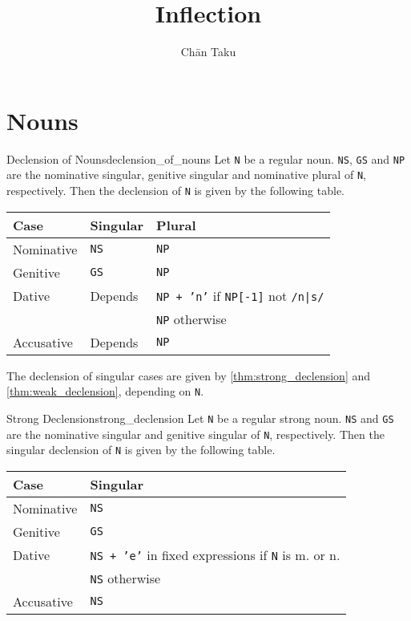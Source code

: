 \documentclass{article}
\title{Inflection}
\author{Ch\=an Taku}
\begin{document}
\maketitle

\section{Nouns}

\begin{theorem}{Declension of Nouns}{declension_of_nouns}
    Let \texttt{N} be a regular noun.
    \texttt{NS}, \texttt{GS} and \texttt{NP} are the nominative singular, genitive singular and nominative plural of \texttt{N}, respectively.
    Then the declension of \texttt{N} is given by the following table.
    \begin{longtable}{lll}
        \toprule
        Case & Singular & Plural \\
        \midrule
        Nominative & \texttt{NS} & \texttt{NP} \\
        Genitive & \texttt{GS} & \texttt{NP} \\
        Dative & Depends & \texttt{NP + 'n'} if \texttt{NP[-1]} not \texttt{/n|s/} \\
        & & \texttt{NP} otherwise \\
        Accusative & Depends & \texttt{NP} \\
        \bottomrule
    \end{longtable}
    The declension of singular cases are given by \cref{thm:strong_declension} and \cref{thm:weak_declension}, depending on \texttt{N}.
\end{theorem}

\begin{theorem}{Strong Declension}{strong_declension}
    Let \texttt{N} be a regular strong noun.
    \texttt{NS} and \texttt{GS} are the nominative singular and genitive singular of \texttt{N}, respectively.
    Then the singular declension of \texttt{N} is given by the following table.
    \begin{longtable}{ll}
        \toprule
        Case & Singular  \\
        \midrule
        Nominative & \texttt{NS} \\
        Genitive & \texttt{GS} \\
        Dative & \texttt{NS + 'e'} in fixed expressions if \texttt{N} is m. or n. \\
        & \texttt{NS} otherwise \\
        Accusative & \texttt{NS} \\
        \bottomrule
    \end{longtable}
\end{theorem}
\end{document}
